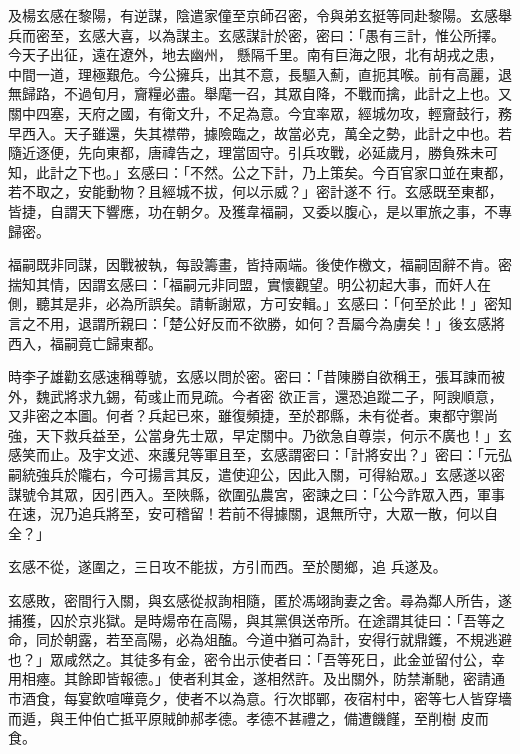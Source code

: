 \begin{pinyinscope}
 及楊玄感在黎陽，有逆謀，陰遣家僮至京師召密，令與弟玄挺等同赴黎陽。玄感舉兵而密至，玄感大喜，以為謀主。玄感謀計於密，密曰：「愚有三計，惟公所擇。今天子出征，遠在遼外，地去幽州，
 懸隔千里。南有巨海之限，北有胡戎之患，中間一道，理極艱危。今公擁兵，出其不意，長驅入薊，直扼其喉。前有高麗，退無歸路，不過旬月，齎糧必盡。舉麾一召，其眾自降，不戰而擒，此計之上也。又關中四塞，天府之國，有衛文升，不足為意。今宜率眾，經城勿攻，輕齎鼓行，務早西入。天子雖還，失其襟帶，據險臨之，故當必克，萬全之勢，此計之中也。若隨近逐便，先向東都，唐禕告之，理當固守。引兵攻戰，必延歲月，勝負殊未可知，此計之下也。」玄感曰：「不然。公之下計，乃上策矣。今百官家口並在東都，若不取之，安能動物？且經城不拔，何以示威？」密計遂不
 行。玄感既至東都，皆捷，自謂天下響應，功在朝夕。及獲韋福嗣，又委以腹心，是以軍旅之事，不專歸密。



 福嗣既非同謀，因戰被執，每設籌畫，皆持兩端。後使作檄文，福嗣固辭不肯。密揣知其情，因謂玄感曰：「福嗣元非同盟，實懷觀望。明公初起大事，而奸人在側，聽其是非，必為所誤矣。請斬謝眾，方可安輯。」玄感曰：「何至於此！」密知言之不用，退謂所親曰：「楚公好反而不欲勝，如何？吾屬今為虜矣！」後玄感將西入，福嗣竟亡歸東都。



 時李子雄勸玄感速稱尊號，玄感以問於密。密曰：「昔陳勝自欲稱王，張耳諫而被外，魏武將求九錫，荀彧止而見疏。今者密
 欲正言，還恐追蹤二子，阿諛順意，又非密之本圖。何者？兵起已來，雖復頻捷，至於郡縣，未有從者。東都守禦尚強，天下救兵益至，公當身先士眾，早定關中。乃欲急自尊崇，何示不廣也！」玄感笑而止。及宇文述、來護兒等軍且至，玄感謂密曰：「計將安出？」密曰：「元弘嗣統強兵於隴右，今可揚言其反，遣使迎公，因此入關，可得紿眾。」玄感遂以密謀號令其眾，因引西入。至陜縣，欲圍弘農宮，密諫之曰：「公今詐眾入西，軍事在速，況乃追兵將至，安可稽留！若前不得據關，退無所守，大眾一散，何以自全？」



 玄感不從，遂圍之，三日攻不能拔，方引而西。至於閿鄉，追
 兵遂及。



 玄感敗，密間行入關，與玄感從叔詢相隨，匿於馮翊詢妻之舍。尋為鄰人所告，遂捕獲，囚於京兆獄。是時煬帝在高陽，與其黨俱送帝所。在途謂其徒曰：「吾等之命，同於朝露，若至高陽，必為俎醢。今道中猶可為計，安得行就鼎鑊，不規逃避也？」眾咸然之。其徒多有金，密令出示使者曰：「吾等死日，此金並留付公，幸用相瘞。其餘即皆報德。」使者利其金，遂相然許。及出關外，防禁漸馳，密請通市酒食，每宴飲喧嘩竟夕，使者不以為意。行次邯鄲，夜宿村中，密等七人皆穿墻而遁，與王仲伯亡抵平原賊帥郝孝德。孝德不甚禮之，備遭饑饉，至削樹
 皮而食。




\end{pinyinscope}
